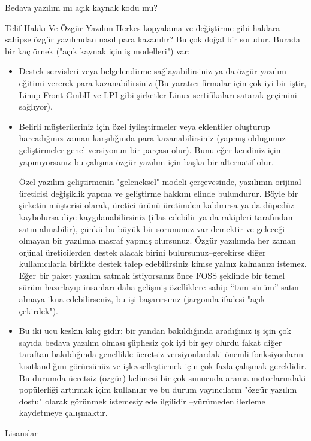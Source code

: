 \begin{section}{Bedava yazılım mı açık kaynak kodu mu?}
\begin{subsection}{Telif Hakkı Ve Özgür Yazılım}
Herkes kopyalama ve değiştirme gibi haklara sahipse özgür yazılımdan nasıl para kazanılır? Bu çok doğal bir sorudur. Burada bir kaç örnek ("açık kaynak için iş modelleri") var:

\begin{itemize}
 \item Destek servisleri veya belgelendirme sağlayabilirsiniz ya da özgür yazılım eğitimi vererek para kazanabilirsiniz (Bu yaratıcı firmalar için çok iyi bir iştir, Linup Front GmbH ve LPI gibi şirketler Linux sertifikaları satarak geçimini sağlıyor).
 \item Belirli müşterileriniz için özel iyileştirmeler veya eklentiler oluşturup harcadığınız zaman karşılığında para kazanabilirsiniz (yapmış oldugunuz geliştirmeler genel versiyonun bir parçası olur). Bunu eğer kendiniz için yapmıyorsanız bu çalışma özgür yazılım için başka bir alternatif olur.

Özel yazılım geliştirmenin "geleneksel" modeli çerçevesinde, yazılımın orijinal üreticisi değişiklik yapma ve geliştirme hakkını elinde bulundurur. Böyle bir şirketin müşterisi olarak, üretici ürünü üretimden kaldırırsa ya da düpedüz kaybolursa diye kaygılanabilirsiniz (iflas edebilir ya da rakipleri tarafından satın alınabilir), çünkü bu büyük bir sorununuz var demektir ve geleceği olmayan bir yazılıma masraf yapmış olursunuz. Özgür yazılımda her zaman orjinal üreticilerden destek alacak birini bulursunuz--gerekirse diğer kullanıcılarla birlikte destek talep edebilirsiniz kimse yalnız kalmanızı istemez. Eğer bir paket yazılım satmak istiyorsanız önce FOSS şeklinde bir temel sürüm hazırlayıp  insanları  daha gelişmiş özelliklere sahip “tam sürüm” satın almaya ikna edebilirseniz, bu işi başarırsınız (jargonda ifadesi "açık çekirdek").

 \item Bu iki ucu keskin kılıç gidir: bir yandan bakıldığında aradığınız iş için çok sayıda bedava yazılım olması şüphesiz çok iyi bir şey olurdu fakat diğer taraftan bakıldığında genellikle ücretsiz versiyonlardaki önemli fonksiyonların kısıtlandığını görürsünüz ve işlevselleştirmek için çok fazla çalışmak gereklidir. Bu durumda ücretsiz (özgür) kelimesi bir çok sunucuda arama motorlarındaki popülerliği artırmak içim kullanılır ve bu durum yayıncıların "özgür yazılım dostu" olarak görünmek istemesiylede ilgilidir --yürümeden ilerleme kaydetmeye çalışmaktır.
 \end{itemize}
\end{subsection}
\begin{subsection}{Lisanslar}


\end{subsection}
\end{section}
